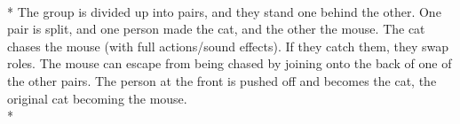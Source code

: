 \begin{minipage}{\textwidth}
\\*
The group is divided up into pairs, and they stand one behind the other.  One pair is split, and one person made the cat, and the other the mouse.  The cat chases the mouse (with full actions/sound effects).  If they catch them, they swap roles.  The mouse can escape from being chased by joining onto the back of one of the other pairs.  The person at the front is pushed off and becomes the cat, the original cat becoming the mouse.\\*
\end{minipage}    \vfill
